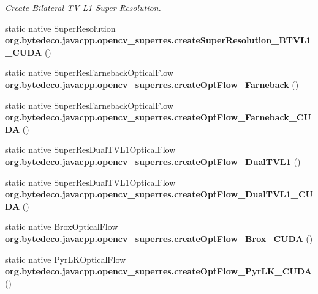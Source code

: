 \begin{DoxyCompactItemize}
\begin{DoxyCompactList}\small\item\em Create Bilateral T\+V-\/\+L1 Super Resolution. \end{DoxyCompactList}\item 
\mbox{\label{group__superres_ga409a232b6a26011f841309b688abbca5}} 
static native Super\+Resolution {\bfseries org.\+bytedeco.\+javacpp.\+opencv\+\_\+superres.\+create\+Super\+Resolution\+\_\+\+B\+T\+V\+L1\+\_\+\+C\+U\+DA} ()
\item 
\mbox{\label{group__superres_ga41c79987b36c67b336b7fb1f81dc8b71}} 
static native Super\+Res\+Farneback\+Optical\+Flow {\bfseries org.\+bytedeco.\+javacpp.\+opencv\+\_\+superres.\+create\+Opt\+Flow\+\_\+\+Farneback} ()
\item 
\mbox{\label{group__superres_ga02fb5d3e9a45defd15e3f5946a809fd4}} 
static native Super\+Res\+Farneback\+Optical\+Flow {\bfseries org.\+bytedeco.\+javacpp.\+opencv\+\_\+superres.\+create\+Opt\+Flow\+\_\+\+Farneback\+\_\+\+C\+U\+DA} ()
\item 
\mbox{\label{group__superres_ga7acc12d47a8480139fae0f34dadf10b8}} 
static native Super\+Res\+Dual\+T\+V\+L1\+Optical\+Flow {\bfseries org.\+bytedeco.\+javacpp.\+opencv\+\_\+superres.\+create\+Opt\+Flow\+\_\+\+Dual\+T\+V\+L1} ()
\item 
\mbox{\label{group__superres_gae9fd8eba9ec266052f794daaf15b32c7}} 
static native Super\+Res\+Dual\+T\+V\+L1\+Optical\+Flow {\bfseries org.\+bytedeco.\+javacpp.\+opencv\+\_\+superres.\+create\+Opt\+Flow\+\_\+\+Dual\+T\+V\+L1\+\_\+\+C\+U\+DA} ()
\item 
\mbox{\label{group__superres_ga7ace69a949f30598fa5db67ed1f8055c}} 
static native Brox\+Optical\+Flow {\bfseries org.\+bytedeco.\+javacpp.\+opencv\+\_\+superres.\+create\+Opt\+Flow\+\_\+\+Brox\+\_\+\+C\+U\+DA} ()
\item 
\mbox{\label{group__superres_ga050475c155016bdf31cdb116af498ae1}} 
static native Pyr\+L\+K\+Optical\+Flow {\bfseries org.\+bytedeco.\+javacpp.\+opencv\+\_\+superres.\+create\+Opt\+Flow\+\_\+\+Pyr\+L\+K\+\_\+\+C\+U\+DA} ()
\end{DoxyCompactItemize}


